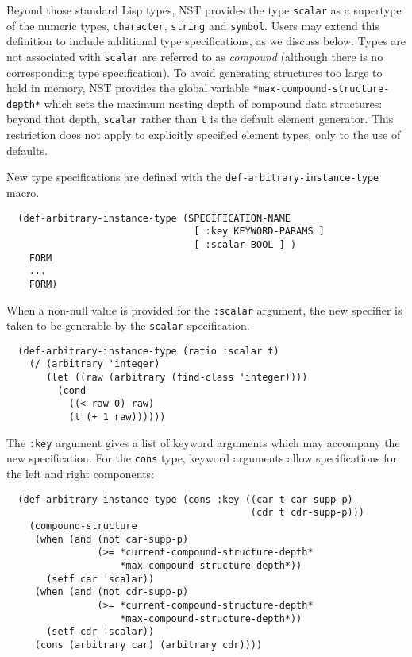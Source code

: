 Beyond those standard Lisp types, NST provides the type
\texttt{scalar} as a supertype of the numeric types,
\texttt{character}, \texttt{string} and \texttt{symbol}.  Users may
extend this definition to include additional type specifications, as
we discuss below.  Types are not associated with \texttt{scalar} are
referred to as \emph{compound} (although there is no corresponding
type specification).  To avoid generating structures too large to hold
in memory, NST provides the global variable
\texttt{*max-compound-structure-depth*} which sets the maximum nesting
depth of compound data structures: beyond that depth, \texttt{scalar}
rather than \texttt{t} is the default element generator.  This
restriction does not apply to explicitly specified element types, only
to the use of defaults.

New type specifications are defined with the
\texttt{def-arbitrary-instance-type} macro.
\begin{verbatim}
  (def-arbitrary-instance-type (SPECIFICATION-NAME
                                 [ :key KEYWORD-PARAMS ]
                                 [ :scalar BOOL ] )
    FORM
    ...
    FORM)
\end{verbatim}
When a non-null value is provided for the \texttt{:scalar} argument,
the new specifier is taken to be generable by the \texttt{scalar}
specification.
\begin{verbatim}
  (def-arbitrary-instance-type (ratio :scalar t)
    (/ (arbitrary 'integer)
       (let ((raw (arbitrary (find-class 'integer))))
         (cond
           ((< raw 0) raw)
           (t (+ 1 raw))))))
\end{verbatim}
The \texttt{:key} argument gives a list of keyword arguments which may
accompany the new specification.  For the \texttt{cons} type, keyword
arguments allow specifications for the left and right components:
\begin{verbatim}
  (def-arbitrary-instance-type (cons :key ((car t car-supp-p)
                                           (cdr t cdr-supp-p)))
    (compound-structure
     (when (and (not car-supp-p)
                (>= *current-compound-structure-depth*
                    *max-compound-structure-depth*))
       (setf car 'scalar))
     (when (and (not cdr-supp-p)
                (>= *current-compound-structure-depth*
                    *max-compound-structure-depth*))
       (setf cdr 'scalar))
     (cons (arbitrary car) (arbitrary cdr))))
\end{verbatim}

